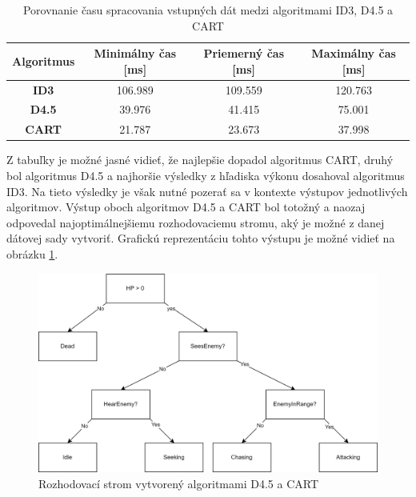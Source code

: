 \documentclass[slovak, master]{diploma}
\begin{document}
\begin{table}[!ht]
    \centering
    \begin{tabular}{|c|ccc|}
    \hline
        \textbf{Algoritmus} & \textbf{Minimálny čas [ms]} & \textbf{Priemerný čas [ms]} & \textbf{Maximálny čas [ms]} \\ \hline
        \textbf{ID3} & 106.989 & 109.559 & 120.763 \\ 
        \textbf{D4.5} & 39.976 & 41.415 & 75.001 \\ 
        \textbf{CART} & 21.787 & 23.673 & 37.998 \\ \hline
    \end{tabular}
    \caption{Porovnanie času spracovania vstupných dát medzi algoritmami ID3, D4.5 a CART}
    \label{tab:benchmarks}
\end{table}

Z tabuľky je možné jasné vidieť, že najlepšie dopadol algoritmus CART, druhý bol algoritmus D4.5 a najhoršie výsledky z hľadiska výkonu dosahoval algoritmus ID3. Na tieto výsledky je však nutné pozerať sa v kontexte výstupov jednotlivých algoritmov. Výstup oboch algoritmov D4.5 a CART bol totožný a naozaj odpovedal najoptimálnejšiemu rozhodovaciemu stromu, aký je možné z danej dátovej sady vytvoriť. Grafickú reprezentáciu tohto výstupu je možné vidieť na obrázku \ref{pic:treeGraph}.

\begin{figure}[!htbp]
    \centering
    \includegraphics[width=1\textwidth]{Figures/Trees.png}
    \caption{Rozhodovací strom vytvorený algoritmami D4.5 a CART}
    \label{pic:treeGraph}
\end{figure}
\end{document}
